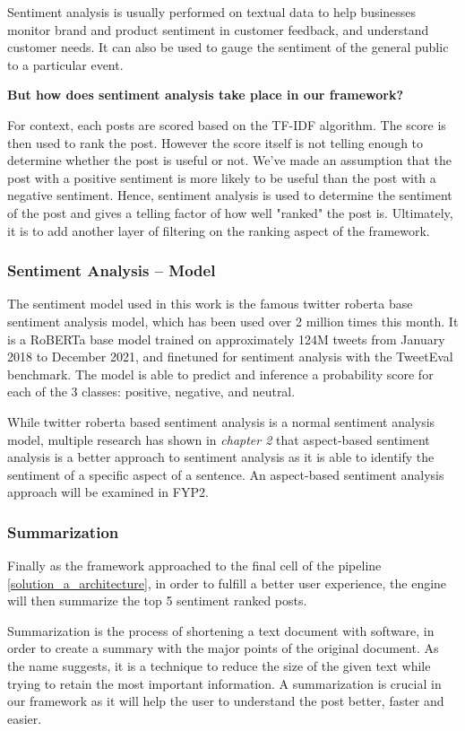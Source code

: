 Sentiment analysis is usually performed on textual data to help businesses monitor brand and product sentiment in customer feedback, and understand customer needs. It can also be used to gauge the sentiment of the general public to a particular event.

\textbf{But how does sentiment analysis take place in our framework? }

For context, each posts are scored based on the TF-IDF algorithm. The score is then used to rank the post. However the score itself is not telling enough to determine whether the post is useful or not. We've made an assumption that the post with a positive sentiment is more likely to be useful than the post with a negative sentiment. Hence, sentiment analysis is used to determine the sentiment of the post and gives a telling factor of how well "ranked" the post is. Ultimately, it is to add another layer of filtering on the ranking aspect of the framework.

\subsubsection{Sentiment Analysis -- Model}
The sentiment model used in this work is the famous twitter roberta base sentiment analysis model, which has been used over 2 million times this month. It is a RoBERTa base model trained on approximately 124M tweets from January 2018 to December 2021, and finetuned for sentiment analysis with the TweetEval benchmark. The model is able to predict and inference a probability score for each of the 3 classes: positive, negative, and neutral. 

While twitter roberta based sentiment analysis is a normal sentiment analysis model, multiple research has shown in \emph{chapter 2} that aspect-based sentiment analysis is a better approach to sentiment analysis as it is able to identify the sentiment of a specific aspect of a sentence. An aspect-based sentiment analysis approach will be examined in FYP2.

\pagebreak
\subsubsection{Summarization} \label{sssec:preprocessing_summarization}
Finally as the framework approached to the final cell of the pipeline \ref{solution_a_architecture}, in order to fulfill a better user experience, the engine will then summarize the top 5 sentiment ranked posts. 

Summarization is the process of shortening a text document with software, in order to create a summary with the major points of the original document. As the name suggests, it is a technique to reduce the size of the given text while trying to retain the most important information. A summarization is crucial in our framework as it will help the user to understand the post better, faster and easier.
 

